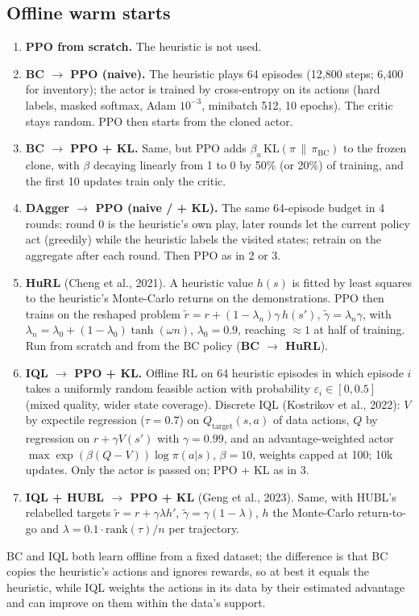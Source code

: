 \documentclass[11pt,a4paper]{article}
\begin{document}
\subsection{Offline warm starts}
\begin{enumerate}[leftmargin=*]
\item \textbf{PPO from scratch.} The heuristic is not used.
\item \textbf{BC $\to$ PPO (naive).} The heuristic plays 64 episodes (12,800 steps; 6,400 for inventory); the actor is
  trained by cross-entropy on its actions (hard labels, masked softmax, Adam $10^{-3}$, minibatch 512, 10 epochs).
  The critic stays random. PPO then starts from the cloned actor.
\item \textbf{BC $\to$ PPO + KL.} Same, but PPO adds $\beta_u\,\mathrm{KL}(\pi \,\|\, \pi_{\mathrm{BC}})$ to the
  frozen clone, with $\beta$ decaying linearly from 1 to 0 by 50\% (or 20\%) of training, and the first 10 updates
  train only the critic.
\item \textbf{DAgger $\to$ PPO (naive / + KL).} The same 64-episode budget in 4 rounds: round 0 is the heuristic's
  own play, later rounds let the current policy act (greedily) while the heuristic labels the visited states; retrain
  on the aggregate after each round. Then PPO as in 2 or 3.
\item \textbf{HuRL} (Cheng et al., 2021). A heuristic value $h(s)$ is fitted by least squares to the heuristic's
  Monte-Carlo returns on the demonstrations. PPO then trains on the reshaped problem
  $\tilde r = r + (1-\lambda_n)\gamma\, h(s')$, $\tilde\gamma = \lambda_n\gamma$, with
  $\lambda_n = \lambda_0 + (1-\lambda_0)\tanh(\omega n)$, $\lambda_0 = 0.9$, reaching $\approx 1$ at half of
  training. Run from scratch and from the BC policy (\textbf{BC $\to$ HuRL}).
\item \textbf{IQL $\to$ PPO + KL.} Offline RL on 64 heuristic episodes in which episode $i$ takes a uniformly random
  feasible action with probability $\varepsilon_i \in [0, 0.5]$ (mixed quality, wider state coverage). Discrete IQL
  (Kostrikov et al., 2022): $V$ by expectile regression ($\tau = 0.7$) on $Q_{\mathrm{target}}(s, a)$ of data
  actions, $Q$ by regression on $r + \gamma V(s')$ with $\gamma = 0.99$, and an advantage-weighted actor
  $\max \exp(\beta (Q - V)) \log \pi(a|s)$, $\beta = 10$, weights capped at 100; 10k updates. Only the actor is passed
  on; PPO + KL as in 3.
\item \textbf{IQL + HUBL $\to$ PPO + KL} (Geng et al., 2023). Same, with HUBL's relabelled targets
  $\tilde r = r + \gamma\lambda h'$, $\tilde\gamma = \gamma(1-\lambda)$, $h$ the Monte-Carlo return-to-go and
  $\lambda = 0.1\cdot\mathrm{rank}(\tau)/n$ per trajectory.
\end{enumerate}
BC and IQL both learn offline from a fixed dataset; the difference is that BC copies the heuristic's actions and ignores
rewards, so at best it equals the heuristic, while IQL weights the actions in its data by their estimated advantage
and can improve on them within the data's support.
\end{document}
